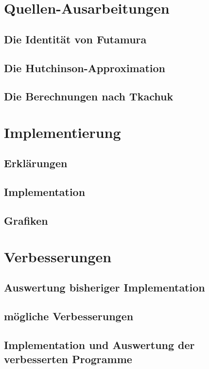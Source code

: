 \documentclass[ngerman,BCOR=4mm]{tudscrreprt}
\theoremstyle{plain} %
\theoremstyle{definition} %
\theoremstyle{remark}
\begin{document}
\chapter{Quellen-Ausarbeitungen}
\label{sec: Quellen}
      \section{Die Identität von Futamura}

      \section{Die Hutchinson-Approximation}

      \section{Die Berechnungen nach Tkachuk}

\chapter{Implementierung}
\label{sec: Programmieren}
      \section{Erklärungen}

      \section{Implementation}

      \section{Grafiken}

\chapter{Verbesserungen}
\label{sec: Verbesserungen}
      \section{Auswertung bisheriger Implementation}

      \section{mögliche Verbesserungen}

      \section{Implementation und Auswertung der verbesserten Programme}
\end{document}
